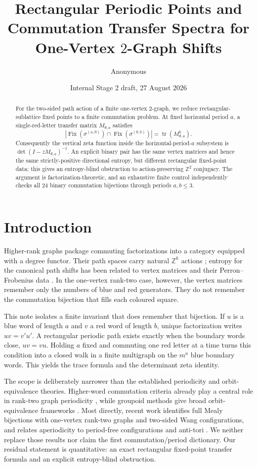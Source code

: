 \documentclass[11pt,a4paper]{amsart}
\title[Commutation transfer spectra]{Rectangular Periodic Points and Commutation Transfer Spectra for One-Vertex $2$-Graph Shifts}
\author{Anonymous}
\date{Internal Stage 2 draft, 27 August 2026}
\theoremstyle{definition}
\theoremstyle{remark}
\newcommand{\Z}{\mathbb Z}
\newcommand{\Fix}{\operatorname{Fix}}
\newcommand{\tr}{\operatorname{tr}}
\begin{document}
\begin{abstract}
For the two-sided path action of a finite one-vertex $2$-graph, we reduce
rectangular-sublattice fixed points to a finite commutation problem.  At fixed
horizontal period $a$, a single-red-letter transfer matrix $M_{\theta,a}$
satisfies
\[
 |\Fix(\sigma^{(a,0)})\cap\Fix(\sigma^{(0,b)})|
 =\tr(M_{\theta,a}^{b}).
\]
Consequently the vertical zeta function inside the horizontal-period-$a$
subsystem is $\det(I-zM_{\theta,a})^{-1}$.  An explicit binary pair has the
same vertex matrices and hence the same strictly-positive directional entropy,
but different rectangular fixed-point data; this gives an entropy-blind
obstruction to action-preserving $\Z^2$ conjugacy.  The argument is
factorization-theoretic, and an exhaustive finite control independently
checks all $24$ binary commutation bijections through periods $a,b\leq3$.
\end{abstract}

\maketitle

\section{Introduction}

Higher-rank graphs package commuting factorizations into a category equipped
with a degree functor.  Their path spaces carry natural $\Z^k$ actions
\cite{KumjianPask2000,KumjianPask2003}; entropy for the canonical path shifts
has been related to vertex matrices and their Perron--Frobenius data
\cite{SkalskiZacharias2008}.  In the one-vertex rank-two case, however, the
vertex matrices remember only the numbers of blue and red generators.  They
do not remember the commutation bijection that fills each coloured square.

This note isolates a finite invariant that does remember that bijection.  If
$u$ is a blue word of length $a$ and $v$ a red word of length $b$, unique
factorization writes $uv=v'u'$.  A rectangular periodic path exists exactly
when the boundary words close, $uv=vu$.  Holding $a$ fixed and commuting one
red letter at a time turns this condition into a closed walk in a finite
multigraph on the $m^a$ blue boundary words.  This yields the trace formula
and the determinant zeta identity.

The scope is deliberately narrower than the established periodicity and
orbit-equivalence theories.  Higher-word commutation criteria already play a
central role in rank-two graph periodicity \cite{DavidsonYang2009}, while
groupoid methods give broad orbit-equivalence frameworks
\cite{CarlsenRout2021}.  Most directly, recent work identifies full Mealy
bijections with one-vertex rank-two graphs and two-sided Wang configurations,
and relates aperiodicity to period-free configurations and anti-tori
\cite{Pask2026}.  We neither replace those results nor claim the first
commutation/period dictionary.  Our residual statement is quantitative: an
exact rectangular fixed-point transfer formula and an explicit
entropy-blind obstruction.
\end{document}
